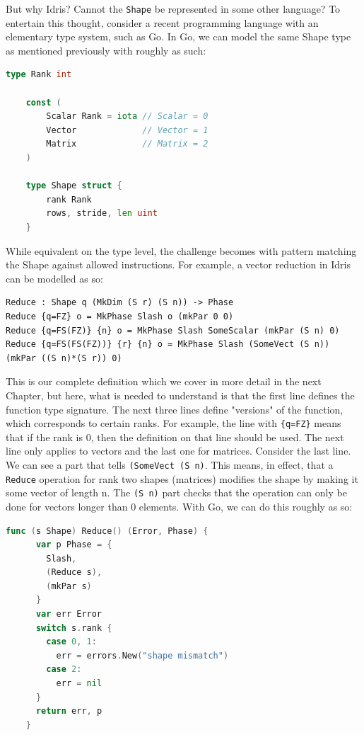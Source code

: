 \documentclass{report}
\begin{document}
But why Idris? Cannot the \verb|Shape| be represented in some other language? To entertain this thought, consider a recent programming language with an elementary type system, such as Go. In Go, we can model the same Shape type as mentioned previously with roughly as such:

\begin{lstlisting}[language=Go]
    type Rank int
    
    const (
        Scalar Rank = iota // Scalar = 0
        Vector             // Vector = 1
        Matrix             // Matrix = 2
    )
    
    type Shape struct {
        rank Rank
        rows, stride, len uint
    }
\end{lstlisting}

While equivalent on the type level, the challenge becomes with pattern matching the Shape against allowed instructions. For example, a vector reduction in Idris can be modelled as so:

\begin{verbatim}
Reduce : Shape q (MkDim (S r) (S n)) -> Phase
Reduce {q=FZ} o = MkPhase Slash o (mkPar 0 0)
Reduce {q=FS(FZ)} {n} o = MkPhase Slash SomeScalar (mkPar (S n) 0)
Reduce {q=FS(FS(FZ))} {r} {n} o = MkPhase Slash (SomeVect (S n)) (mkPar ((S n)*(S r)) 0)
\end{verbatim}

This is our complete definition which we cover in more detail in the next Chapter, but here, what is needed to understand is that the first line defines the function type signature. The next three lines define "versions" of the function, which corresponds to certain ranks. For example, the line with \verb|{q=FZ}| means that if the rank is 0, then the definition on that line should be used. The next line only applies to vectors and the last one for matrices. Consider the last line. We can see a part that tells \verb|(SomeVect (S n)|. This means, in effect, that a \verb|Reduce| operation for rank two shapes (matrices) modifies the shape by making it some vector of length n. The \verb|(S n)| part checks that the operation can only be done for vectors longer than 0 elements. With Go, we can do this roughly as so:

\begin{lstlisting}[language=Go]
    func (s Shape) Reduce() (Error, Phase) {
      var p Phase = {
        Slash,
        (Reduce s),
        (mkPar s)
      }
      var err Error
      switch s.rank {
        case 0, 1:
          err = errors.New("shape mismatch")
        case 2:
          err = nil
      }
      return err, p
    }
\end{lstlisting}
\end{document}
